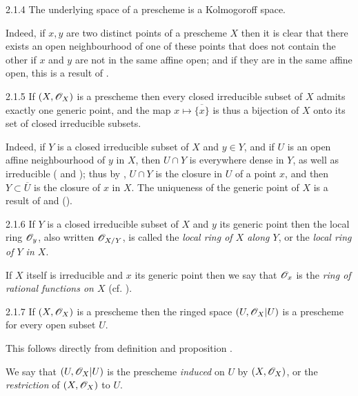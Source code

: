 \begin{envs}[Proposition]{2.1.4}
\label{prop-1.2.1.4}
The underlying space of a prescheme is a Kolmogoroff space.
\end{envs}

Indeed, if $x,y$ are two distinct points of a prescheme $X$ then it is clear
that there exists an open neighbourhood of one of these points that does not
contain the other if $x$ and $y$ are not in the same affine open; and if they
are in the same affine open, this is a result of .

\begin{envs}[Proposition]{2.1.5}
\label{prop-1.2.1.5}
If $(X,\mathscr{O}_X)$ is a prescheme then every closed
irreducible subset of $X$ admits exactly one generic point, and the map
$x\mapsto\overline{\{x\}}$ is thus a bijection of $X$ onto its set of closed
irreducible subsets.
\end{envs}

Indeed, if $Y$ is a closed irreducible subset of $X$ and $y\in Y$, and if $U$
is an open affine neighbourhood of $y$ in $X$, then $U\cap Y$ is everywhere
dense in $Y$, as well as irreducible ( and ); thus by
, $U\cap Y$ is the closure in $U$ of a point $x$, and then
$Y\subset\overline{U}$ is the closure of $x$ in $X$. The uniqueness of the
generic point of $X$ is a result of  and ().

\begin{env}{2.1.6}
\label{env-1.2.1.6}
If $Y$ is a closed irreducible subset of $X$ and $y$ its
generic point then the local ring $\mathscr{O}_y$, also written $\mathscr{O}_{X/Y}$, is called the
\emph{local ring of $X$ along $Y$}, or the \emph{local ring of $Y$ in $X$}.

If $X$ itself is irreducible and $x$ its generic point then we say that
$\mathscr{O}_x$ is the \emph{ring of rational functions on $X$} (cf. ).
\end{env}

\begin{envs}[Proposition]{2.1.7}
\label{prop-1.2.1.7}
If $(X,\mathscr{O}_X)$ is a prescheme then the ringed
space $(U,\mathscr{O}_X|U)$ is a prescheme for every open subset $U$.
\end{envs}

This follows directly from definition  and proposition .

We say that $(U,\mathscr{O}_X|U)$ is the prescheme \emph{induced} on $U$ by
$(X,\mathscr{O}_X)$, or the \emph{restriction} of $(X,\mathscr{O}_X)$ to $U$.

